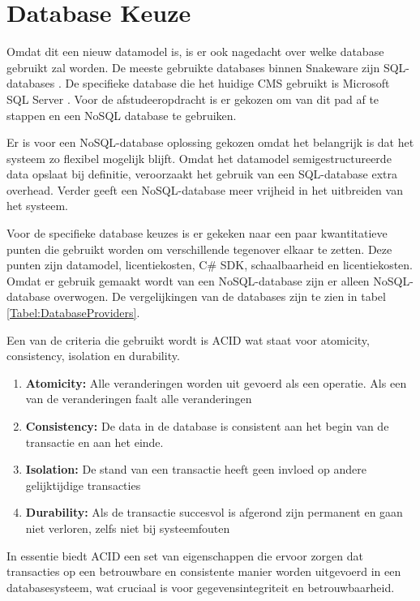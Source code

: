 \section{Database Keuze}
\label{section:DatabaseKeuze}
Omdat dit een nieuw datamodel is, is er ook nagedacht over welke database gebruikt zal worden.
De meeste gebruikte databases binnen Snakeware zijn SQL-databases \parencite{SQL}.
De specifieke database die het huidige CMS gebruikt is Microsoft SQL Server \parencite{MSQLServer}.
Voor de afstudeeropdracht is er gekozen om van dit pad af te stappen en een NoSQL \parencite{NoSQL} database te gebruiken.

\whitespace
Er is voor een NoSQL-database oplossing gekozen omdat het belangrijk is dat het systeem zo flexibel mogelijk blijft.
Omdat het datamodel semigestructureerde data opslaat bij definitie, veroorzaakt het gebruik van een SQL-database extra overhead.
Verder geeft een NoSQL-database meer vrijheid in het uitbreiden van het systeem.

\whitespace
Voor de specifieke database keuzes is er gekeken naar een paar kwantitatieve punten die gebruikt worden om verschillende tegenover elkaar te zetten.
Deze punten zijn datamodel, licentiekosten, C\# \gls{SDK}, schaalbaarheid en licentiekosten.
Omdat er gebruik gemaakt wordt van een NoSQL-database zijn er alleen NoSQL-database overwogen.
De vergelijkingen van de databases zijn te zien in tabel \ref{Tabel:DatabaseProviders}.

\whitespace
Een van de criteria die gebruikt wordt is ACID \parencite{ACID} wat staat voor atomicity, consistency, isolation en durability.
\begin{enumerate}
	\item{\textbf{Atomicity:} Alle veranderingen worden uit gevoerd als een operatie.
	      Als een van de veranderingen faalt alle veranderingen}
	\item{\textbf{Consistency:} De data in de database is consistent aan het begin van de transactie en aan het einde.}
	\item{\textbf{Isolation:} De stand van een transactie heeft geen invloed op andere gelijktijdige transacties }
	\item{\textbf{Durability:} Als de transactie succesvol is afgerond zijn permanent en gaan niet verloren, zelfs niet bij systeemfouten  }
\end{enumerate}

In essentie biedt ACID een set van eigenschappen die ervoor zorgen dat transacties op een betrouwbare en consistente manier worden uitgevoerd in een databasesysteem, wat cruciaal is voor gegevensintegriteit en betrouwbaarheid.


